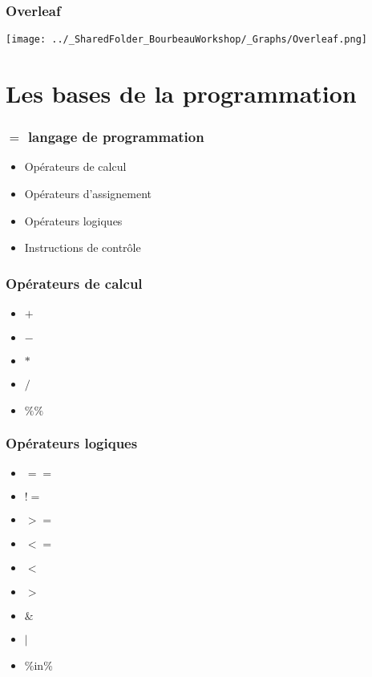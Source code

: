 \documentclass{beamer}
\begin{document}
    \begin{frame}
        \frametitle{Overleaf}
        \begin{center}
           \texttt{[image: ../\_SharedFolder\_BourbeauWorkshop/\_Graphs/Overleaf.png]}
        \end{center}  
    \end{frame}

\section{\R {} Les bases de la programmation}

    \begin{frame}
        \frametitle{\R $=$ langage de programmation}
        \begin{itemize}
            \item Opérateurs de calcul
            \item Opérateurs d'assignement
            \item Opérateurs logiques
            \item Instructions de contrôle
        \end{itemize}
    \end{frame}

    \begin{frame}
        \frametitle{Opérateurs de calcul}
        \begin{itemize}
            \item $+$
            \item $-$
            \item $*$
            \item $/$
            \item $\%\%$ 
        \end{itemize}
    \end{frame}
    
    \begin{frame}
        \frametitle{Opérateurs logiques}
        \begin{itemize}
            \item $==$
            \item $!=$
            \item $>=$
            \item $<=$
            \item $<$
            \item $>$
            \item $\&$
            \item $|$
            \item \%in\%
        \end{itemize}
    \end{frame}
    
\end{document}
